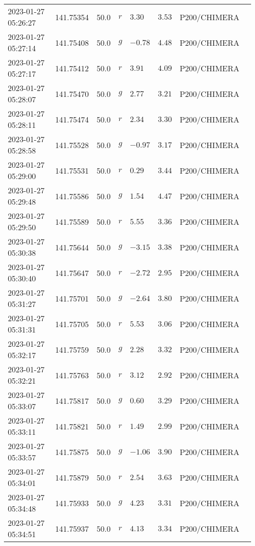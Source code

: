 \documentclass{nature_plusfigure}
\begin{document}
\begin{supplement}
\begin{center}
\begin{longtable}{llllllll}
2023-01-27 05:26:27 & 141.75354 & 50.0 & $r$ & $3.30$ & $3.53$ & P200/CHIMERA &  \\ 
2023-01-27 05:27:14 & 141.75408 & 50.0 & $g$ & $-0.78$ & $4.48$ & P200/CHIMERA &  \\ 
2023-01-27 05:27:17 & 141.75412 & 50.0 & $r$ & $3.91$ & $4.09$ & P200/CHIMERA &  \\ 
2023-01-27 05:28:07 & 141.75470 & 50.0 & $g$ & $2.77$ & $3.21$ & P200/CHIMERA &  \\ 
2023-01-27 05:28:11 & 141.75474 & 50.0 & $r$ & $2.34$ & $3.30$ & P200/CHIMERA &  \\ 
2023-01-27 05:28:58 & 141.75528 & 50.0 & $g$ & $-0.97$ & $3.17$ & P200/CHIMERA &  \\ 
2023-01-27 05:29:00 & 141.75531 & 50.0 & $r$ & $0.29$ & $3.44$ & P200/CHIMERA &  \\ 
2023-01-27 05:29:48 & 141.75586 & 50.0 & $g$ & $1.54$ & $4.47$ & P200/CHIMERA &  \\ 
2023-01-27 05:29:50 & 141.75589 & 50.0 & $r$ & $5.55$ & $3.36$ & P200/CHIMERA &  \\ 
2023-01-27 05:30:38 & 141.75644 & 50.0 & $g$ & $-3.15$ & $3.38$ & P200/CHIMERA &  \\ 
2023-01-27 05:30:40 & 141.75647 & 50.0 & $r$ & $-2.72$ & $2.95$ & P200/CHIMERA &  \\ 
2023-01-27 05:31:27 & 141.75701 & 50.0 & $g$ & $-2.64$ & $3.80$ & P200/CHIMERA &  \\ 
2023-01-27 05:31:31 & 141.75705 & 50.0 & $r$ & $5.53$ & $3.06$ & P200/CHIMERA &  \\ 
2023-01-27 05:32:17 & 141.75759 & 50.0 & $g$ & $2.28$ & $3.32$ & P200/CHIMERA &  \\ 
2023-01-27 05:32:21 & 141.75763 & 50.0 & $r$ & $3.12$ & $2.92$ & P200/CHIMERA &  \\ 
2023-01-27 05:33:07 & 141.75817 & 50.0 & $g$ & $0.60$ & $3.29$ & P200/CHIMERA &  \\ 
2023-01-27 05:33:11 & 141.75821 & 50.0 & $r$ & $1.49$ & $2.99$ & P200/CHIMERA &  \\ 
2023-01-27 05:33:57 & 141.75875 & 50.0 & $g$ & $-1.06$ & $3.90$ & P200/CHIMERA &  \\ 
2023-01-27 05:34:01 & 141.75879 & 50.0 & $r$ & $2.54$ & $3.63$ & P200/CHIMERA &  \\ 
2023-01-27 05:34:48 & 141.75933 & 50.0 & $g$ & $4.23$ & $3.31$ & P200/CHIMERA &  \\ 
2023-01-27 05:34:51 & 141.75937 & 50.0 & $r$ & $4.13$ & $3.34$ & P200/CHIMERA &  \\ 

\end{longtable}
\end{center}
\end{supplement}
\end{document}
